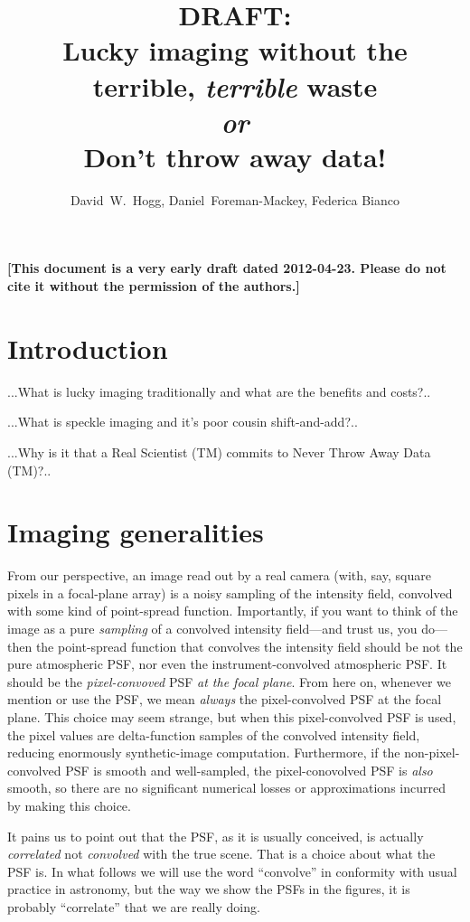 \documentclass[12pt,preprint]{aastex}
\title{DRAFT: \\
  Lucky imaging without the terrible, \emph{terrible} waste \\
  \textit{or} \\
  Don't throw away data!}
\author{
  David~W.~Hogg\altaffilmark{\ref{CCPP},\ref{MPIA},\ref{email}},
  Daniel~Foreman-Mackey\altaffilmark{\ref{CCPP}},
  Federica Bianco\altaffilmark{\ref{CCPP},\ref{LCOGT}}
}
\begin{document}
\textbf{[This document is a very early draft dated 2012-04-23.  Please do not cite it without the permission of the authors.]}

\section{Introduction}

...What is lucky imaging traditionally and what are the benefits and costs?..

...What is speckle imaging and it's poor cousin shift-and-add?..

...Why is it that a Real Scientist (TM) commits to Never Throw Away Data (TM)?..

\section{Imaging generalities}

From our perspective, an image read out by a real camera (with, say,
square pixels in a focal-plane array) is a noisy sampling of the
intensity field, convolved with some kind of point-spread function.
Importantly, if you want to think of the image as a pure
\emph{sampling} of a convolved intensity field---and trust us, you
do---then the point-spread function that convolves the intensity field
should be not the pure atmospheric PSF, nor even the
instrument-convolved atmospheric PSF.  It should be the
\emph{pixel-convoved} PSF \emph{at the focal plane}.  From here on,
whenever we mention or use the PSF, we mean \emph{always} the
pixel-convolved PSF at the focal plane.  This choice may seem strange,
but when this pixel-convolved PSF is used, the pixel values are
delta-function samples of the convolved intensity field, reducing
enormously synthetic-image computation.  Furthermore, if the
non-pixel-convolved PSF is smooth and well-sampled, the
pixel-conovolved PSF is \emph{also} smooth, so there are no significant
numerical losses or approximations incurred by making this choice.

It pains us to point out that the PSF, as it is usually conceived, is
actually \emph{correlated} not \emph{convolved} with the true scene.
That is a choice about what the PSF is.  In what follows we will use
the word ``convolve'' in conformity with usual practice in astronomy,
but the way we show the PSFs in the figures, it is probably
``correlate'' that we are really doing.
\end{document}

